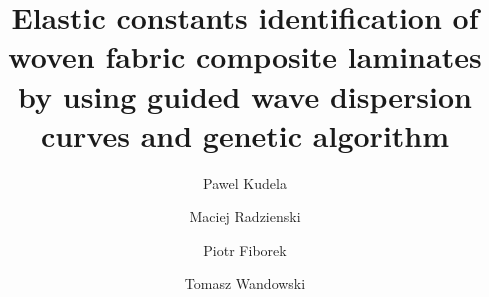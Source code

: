 \documentclass[preprint,12pt]{elsarticle}
\begin{document}
	\begin{frontmatter}
		
		\title{Elastic constants identification of woven fabric composite laminates by using guided wave dispersion curves and genetic algorithm}
		
		\address[IFFM]{Institute of Fluid Flow Machinery, Polish Academy of Sciences, Poland}
		
		
		\author{Pawel Kudela}
		\author{Maciej Radzienski}
		\author{Piotr Fiborek }
		\author{Tomasz Wandowski }	
		

\end{frontmatter}
\end{document}
